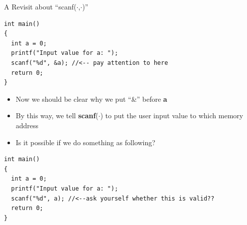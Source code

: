 \begin{frame}[fragile]{A Revisit about ``scanf($\cdot$,$\cdot$)''}
\vspace{-0.15in}
\begin{lstlisting}[xleftmargin=0.08\linewidth, linewidth=0.9\linewidth]
int main()
{
  int a = 0;
  printf("Input value for a: ");
  scanf("%d", &a); //<-- pay attention to here
  return 0;
}
\end{lstlisting}
\vspace{-0.15in}
\begin{itemize}
	\item {Now we should be clear why we put ``\&'' before \textbf{a}}
	\item {By this way, we tell \textbf{scanf}($\cdot$) to put the user input value to which memory address}
	\item {Is it possible if we do something as following?}
\end{itemize}
\begin{lstlisting}[xleftmargin=0.01\linewidth, linewidth=0.99\linewidth]
int main()
{
  int a = 0;
  printf("Input value for a: ");
  scanf("%d", a); //<--ask yourself whether this is valid??
  return 0;
}
\end{lstlisting}
\end{frame}